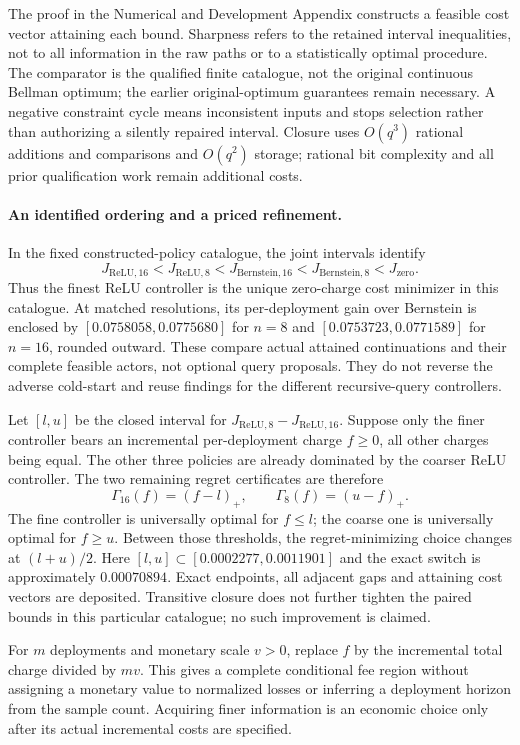 The proof in the Numerical and Development Appendix constructs a feasible cost vector attaining each bound. Sharpness refers to the retained interval inequalities, not to all information in the raw paths or to a statistically optimal procedure. The comparator is the qualified finite catalogue, not the original continuous Bellman optimum; the earlier original-optimum guarantees remain necessary. A negative constraint cycle means inconsistent inputs and stops selection rather than authorizing a silently repaired interval. Closure uses $O(q^3)$ rational additions and comparisons and $O(q^2)$ storage; rational bit complexity and all prior qualification work remain additional costs.

\paragraph{An identified ordering and a priced refinement.}
In the fixed constructed-policy catalogue, the joint intervals identify
\[
 J_{\mathrm{ReLU},16}<J_{\mathrm{ReLU},8}
 <J_{\mathrm{Bernstein},16}<J_{\mathrm{Bernstein},8}<J_{\mathrm{zero}}.
\]
Thus the finest ReLU controller is the unique zero-charge cost minimizer in this catalogue. At matched resolutions, its per-deployment gain over Bernstein is enclosed by $[0.0758058,0.0775680]$ for $n=8$ and $[0.0753723,0.0771589]$ for $n=16$, rounded outward. These compare actual attained continuations and their complete feasible actors, not optional query proposals. They do not reverse the adverse cold-start and reuse findings for the different recursive-query controllers.

Let $[l,u]$ be the closed interval for $J_{\mathrm{ReLU},8}-J_{\mathrm{ReLU},16}$. Suppose only the finer controller bears an incremental per-deployment charge $f\ge0$, all other charges being equal. The other three policies are already dominated by the coarser ReLU controller. The two remaining regret certificates are therefore
\[
 \Gamma_{16}(f)=(f-l)_+,\qquad \Gamma_8(f)=(u-f)_+.
\]
The fine controller is universally optimal for $f\le l$; the coarse one is universally optimal for $f\ge u$. Between those thresholds, the regret-minimizing choice changes at $(l+u)/2$. Here $[l,u]\subset[0.0002277,0.0011901]$ and the exact switch is approximately $0.00070894$. Exact endpoints, all adjacent gaps and attaining cost vectors are deposited. Transitive closure does not further tighten the paired bounds in this particular catalogue; no such improvement is claimed.

For $m$ deployments and monetary scale $v>0$, replace $f$ by the incremental total charge divided by $mv$. This gives a complete conditional fee region without assigning a monetary value to normalized losses or inferring a deployment horizon from the sample count. Acquiring finer information is an economic choice only after its actual incremental costs are specified.
